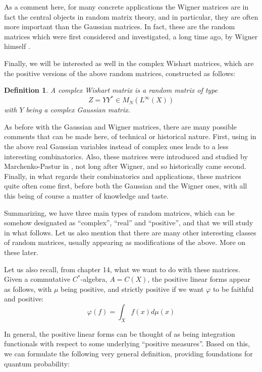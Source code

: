 \documentclass[12pt]{amsbook}
\newtheorem{definition}[theorem]{Definition}
\begin{document}
As a comment here, for many concrete applications the Wigner matrices are in fact the central objects in random matrix theory, and in particular, they are often more important than the Gaussian matrices. In fact, these are the random matrices which were first considered and investigated, a long time ago, by Wigner himself \cite{wig}.

\bigskip

Finally, we will be interested as well in the complex Wishart matrices, which are the positive versions of the above random matrices, constructed as follows: 

\begin{definition}
A complex Wishart matrix is a random matrix of type
$$Z=YY^*\in M_N(L^\infty(X))$$
with $Y$ being a complex Gaussian matrix.
\end{definition}

As before with the Gaussian and Wigner matrices, there are many possible comments that can be made here, of technical or historical nature. First, using in the above real Gaussian variables instead of complex ones leads to a less interesting combinatorics. Also, these matrices were introduced and studied by Marchenko-Pastur in \cite{mpa}, not long after Wigner, and so historically came second. Finally, in what regards their combinatorics and applications, these matrices quite often come first, before both the Gaussian and the Wigner ones, with all this being of course a matter of knowledge and taste.

\bigskip

Summarizing, we have three main types of random matrices, which can be somehow designated as ``complex'', ``real'' and ``positive'', and that we will study in what follows. Let us also mention that there are many other interesting classes of random matrices, usually appearing as modifications of the above. More on these later.

\bigskip

Let us also recall, from chapter 14, what we want to do with these matrices. Given a commutative $C^*$-algebra, $A=C(X)$, the positive linear forms appear as follows, with $\mu$ being positive, and strictly positive if we want $\varphi$ to be faithful and positive:
$$\varphi(f)=\int_Xf(x)d\mu(x)$$

In general, the positive linear forms can be thought of as being integration functionals with respect to some underlying ``positive measures''. Based on this, we can formulate the following very general definition, providing foundations for quantum probability:
\end{document}
